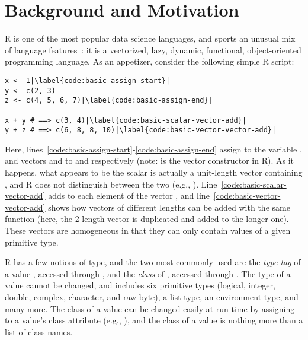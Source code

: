 \section{Background and Motivation}


R is one of the most popular data science languages, and sports an unusual mix of language features~\cite{morandat2012evaluating}: it is a vectorized, lazy, dynamic, functional, object-oriented programming language.
As an appetizer, consider the following simple R script:
\begin{lstlisting}[escapechar=|]
x <- 1|\label{code:basic-assign-start}|
y <- c(2, 3)
z <- c(4, 5, 6, 7)|\label{code:basic-assign-end}|

x + y # ==> c(3, 4)|\label{code:basic-scalar-vector-add}|
y + z # ==> c(6, 8, 8, 10)|\label{code:basic-vector-vector-add}|
\end{lstlisting}
Here, lines~\ref{code:basic-assign-start}-\ref{code:basic-assign-end} assign  to the variable , and vectors \code{[2, 3]} and \code{[4, 5, 6, 7]} to  and  respectively (note:  is the vector constructor in R).
As it happens, what appears to be the scalar  is actually a unit-length vector containing , and R does not distinguish between the two (e.g., ).
Line~\ref{code:basic-scalar-vector-add} adds  to each element of the vector , and line~\ref{code:basic-vector-vector-add} shows how vectors of different lengths can be added with the same  function (here, the 2 length vector is duplicated and added to the longer one).
These vectors are homogeneous in that they can only contain values of a given primitive type.

R has a few notions of type, and the two most commonly used are the \textit{type tag} of a value , accessed through , and the \textit{class} of , accessed through .
The  type of a value cannot be changed, and includes six primitive types (logical, integer, double, complex, character, and raw byte), a list type, an environment type, and many more.
The class of a value can be changed easily at run time by assigning to a value's class attribute (e.g., ), and the class of a value is nothing more than a list of class names.


